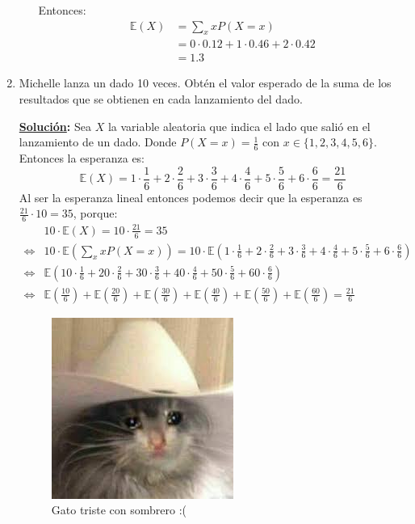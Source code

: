 \documentclass[11pt,letterpaper]{report}
\newcommand{\sol}{\textbf{\underline{Solución}: }} %
\begin{document}
\begin{enumerate}
\begin{itemize}
    Entonces:
    \begin{align*}
        \mathds{E}(X)
            &= \sum_{x} x P(X=x)\\
            &= 0 \cdot 0.12 + 1 \cdot 0.46 + 2 \cdot 0.42\\
            &= 1.3
    \end{align*}
    
\end{itemize}
\item Michelle lanza un dado 10 veces. Obtén el valor esperado de la suma de los resultados que
se obtienen en cada lanzamiento del dado.

\sol Sea $X$ la variable aleatoria que indica el lado que salió en el lanzamiento de un dado.
Donde $P(X=x) = \frac{1}{6}$ con $x \in \{ 1,2,3,4,5,6 \}$. Entonces la esperanza es:
\[
    \mathds{E}(X) =
        1 \cdot \frac{1}{6} + 2 \cdot \frac{2}{6} + 3 \cdot \frac{3}{6} + 4 \cdot \frac{4}{6} +
        5 \cdot \frac{5}{6} + 6 \cdot \frac{6}{6} = \frac{21}{6}
\]
Al ser la esperanza lineal entonces podemos decir que la esperanza es $\frac{21}{6} \cdot 10 = 35$, porque:
\begin{align*}
    & 10 \cdot \mathds{E}(X) = 10 \cdot \frac{21}{6} = 35\\
    \iff& 10 \cdot \mathds{E}(\sum_x x P(X=x)) = 10 \cdot \mathds{E}(1 \cdot \frac{1}{6} + 2 \cdot \frac{2}{6} + 
        3 \cdot \frac{3}{6} + 4 \cdot \frac{4}{6} + 5 \cdot \frac{5}{6} + 6 \cdot \frac{6}{6})\\
    \iff& \mathds{E}(10 \cdot \frac{1}{6} + 20 \cdot \frac{2}{6} + 
    30 \cdot \frac{3}{6} + 40 \cdot \frac{4}{6} + 50 \cdot \frac{5}{6} + 60 \cdot \frac{6}{6})\\
    \iff& \mathds{E}(\frac{10}{6}) + \mathds{E}(\frac{20}{6}) + \mathds{E}(\frac{30}{6}) + \mathds{E}(\frac{40}{6}) +
    \mathds{E}(\frac{50}{6}) + \mathds{E}(\frac{60}{6}) = \frac{21}{6}
\end{align*}

\begin{figure}[H]
    \centering
    \includegraphics[scale=0.5]{triste.jpg}
    \caption{Gato triste con sombrero :(}
\end{figure}


\end{enumerate}
\end{document}
